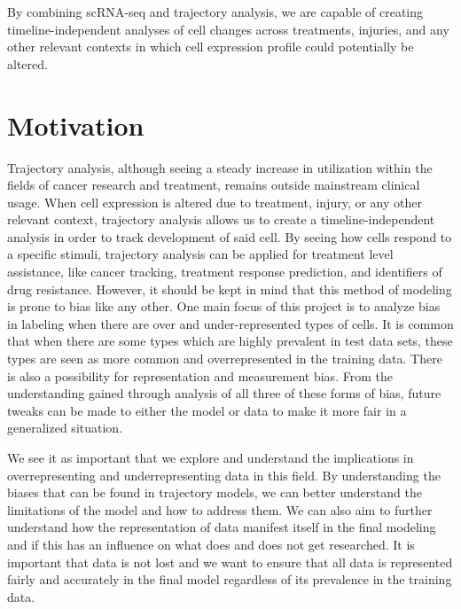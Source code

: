 \documentclass{article}
\begin{document}
By combining scRNA-seq and trajectory analysis, we are capable of creating timeline-independent analyses of cell changes across treatments, injuries, and any other relevant contexts in which cell expression profile could potentially be altered.

\section{Motivation}
Trajectory analysis, although seeing a steady increase in utilization within the fields of cancer research and treatment, remains outside mainstream clinical usage. When cell expression is altered due to treatment, injury, or any other relevant context, trajectory analysis allows us to create a timeline-independent analysis in order to track development of said cell. By seeing how cells respond to a specific stimuli, trajectory analysis can be applied for treatment level assistance, like cancer tracking, treatment response prediction, and identifiers of drug resistance. However, it should be kept in mind that this method of modeling is prone to bias like any other. One main focus of this project is to analyze bias in labeling when there are over and under-represented types of cells. It is common that when there are some types which are highly prevalent in test data sets, these types are seen as more common and overrepresented in the training data. There is also a possibility for representation and measurement bias. From the understanding gained through analysis of all three of these forms of bias, future tweaks can be made to either the model or data to make it more fair in a generalized situation.

We see it as important that we explore and understand the implications in overrepresenting and underrepresenting data in this field. By understanding the biases that can be found in trajectory models, we can better understand the limitations of the model and how to address them. We can also aim to further understand how the representation of data manifest itself in the final modeling and if this has an influence on what does and does not get researched. It is important that data is not lost and we want to ensure that all data is represented fairly and accurately in the final model regardless of its prevalence in the training data.
\end{document}
